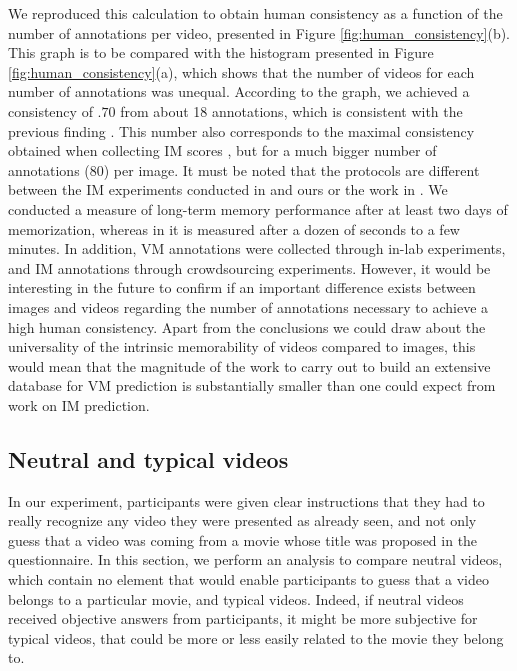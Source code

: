 \documentclass[sigconf]{acmart}
\begin{document}
We reproduced this calculation to obtain human consistency as a function of the number of annotations per video, presented in Figure \ref{fig:human_consistency}(b).
This graph is to be compared with the histogram presented in Figure \ref{fig:human_consistency}(a), which shows that the number of videos for each number of annotations was unequal.
According to the graph, we achieved a consistency of $.70$ from about 18 annotations, which is consistent with the previous finding \cite{han_2015_learning}.
This number also corresponds to the maximal consistency obtained when collecting IM scores \cite{isola_2011_makes,khosla_2015_understanding}, but for a much bigger number of annotations (80) per image.
It must be noted that the protocols are different between the IM experiments conducted in \cite{isola_2011_makes,khosla_2015_understanding} and ours or the work in \cite{han_2015_learning}.
We conducted a measure of long-term memory performance after at least two days of memorization, whereas in \cite{isola_2011_makes,khosla_2015_understanding} it is measured after a dozen of seconds to a few minutes. 
In addition, VM annotations were collected through in-lab experiments, and IM annotations through crowdsourcing experiments.
However, it would be interesting in the future to confirm if an important difference exists between images and videos regarding the number of annotations necessary to achieve a high human consistency.
Apart from the conclusions we could draw about the universality of the intrinsic memorability of videos compared to images, this would mean that the magnitude of the work to carry out to build an extensive database for VM prediction is substantially smaller than one could expect from work on IM prediction.

\subsection{Neutral and typical videos}
In our experiment, participants were given clear instructions that they had to really recognize any video they were presented as already seen, and not only guess that a video was coming from a movie whose title was proposed in the questionnaire.
In this section, we perform an analysis to compare neutral videos, which contain no element that would enable participants to guess that a video belongs to a particular movie, and typical videos.
Indeed, if neutral videos received objective answers from participants, it might be more subjective for typical videos, that could be more or less easily related to the movie they belong to.
\end{document}

